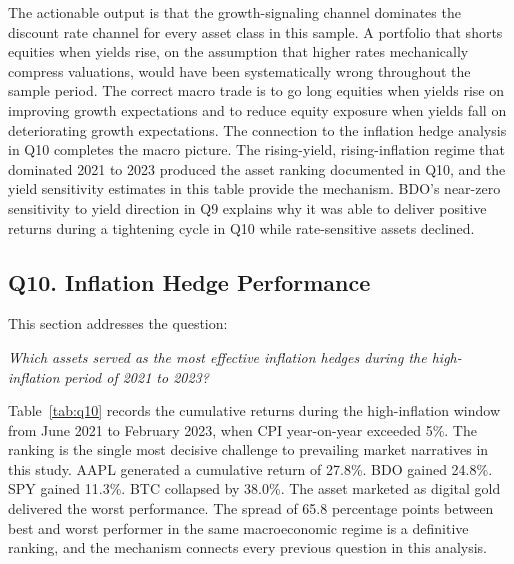 The actionable output is that the growth-signaling channel dominates the discount rate channel for every asset class in this sample. A portfolio that shorts equities when yields rise, on the assumption that higher rates mechanically compress valuations, would have been systematically wrong throughout the sample period. The correct macro trade is to go long equities when yields rise on improving growth expectations and to reduce equity exposure when yields fall on deteriorating growth expectations. The connection to the inflation hedge analysis in Q10 completes the macro picture. The rising-yield, rising-inflation regime that dominated 2021 to 2023 produced the asset ranking documented in Q10, and the yield sensitivity estimates in this table provide the mechanism. BDO's near-zero sensitivity to yield direction in Q9 explains why it was able to deliver positive returns during a tightening cycle in Q10 while rate-sensitive assets declined.

\subsection{Q10. Inflation Hedge Performance}

This section addresses the question:

\noindent\textit{Which assets served as the most effective inflation hedges during the high-inflation period of 2021 to 2023?}



Table~\ref{tab:q10} records the cumulative returns during the high-inflation window from June 2021 to February 2023, when CPI year-on-year exceeded 5\%. The ranking is the single most decisive challenge to prevailing market narratives in this study. AAPL generated a cumulative return of 27.8\%. BDO gained 24.8\%. SPY gained 11.3\%. BTC collapsed by 38.0\%. The asset marketed as digital gold delivered the worst performance. The spread of 65.8 percentage points between best and worst performer in the same macroeconomic regime is a definitive ranking, and the mechanism connects every previous question in this analysis.

